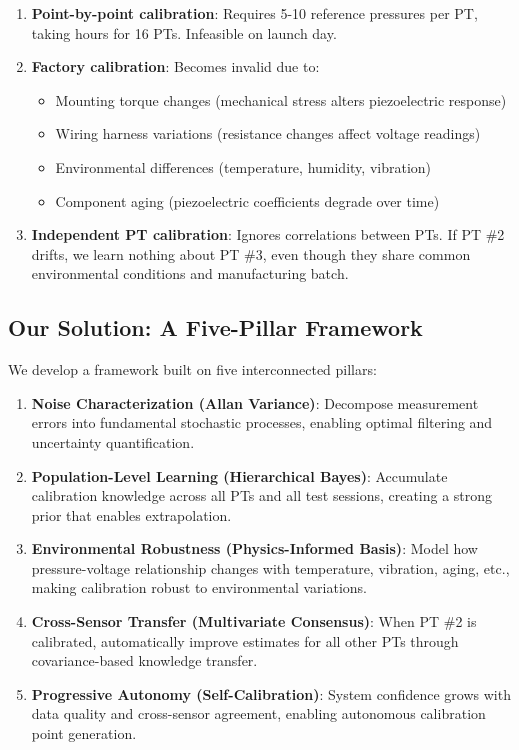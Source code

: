 \documentclass[11pt]{article}
\begin{document}
\begin{enumerate}
\item \textbf{Point-by-point calibration}: Requires 5-10 reference pressures per PT, taking hours for 16 PTs. Infeasible on launch day.

\item \textbf{Factory calibration}: Becomes invalid due to:
\begin{itemize}
\item Mounting torque changes (mechanical stress alters piezoelectric response)
\item Wiring harness variations (resistance changes affect voltage readings)
\item Environmental differences (temperature, humidity, vibration)
\item Component aging (piezoelectric coefficients degrade over time)
\end{itemize}

\item \textbf{Independent PT calibration}: Ignores correlations between PTs. If PT \#2 drifts, we learn nothing about PT \#3, even though they share common environmental conditions and manufacturing batch.
\end{enumerate}

\subsection{Our Solution: A Five-Pillar Framework}

We develop a framework built on five interconnected pillars:

\begin{enumerate}
\item \textbf{Noise Characterization (Allan Variance)}: Decompose measurement errors into fundamental stochastic processes, enabling optimal filtering and uncertainty quantification.

\item \textbf{Population-Level Learning (Hierarchical Bayes)}: Accumulate calibration knowledge across all PTs and all test sessions, creating a strong prior that enables extrapolation.

\item \textbf{Environmental Robustness (Physics-Informed Basis)}: Model how pressure-voltage relationship changes with temperature, vibration, aging, etc., making calibration robust to environmental variations.

\item \textbf{Cross-Sensor Transfer (Multivariate Consensus)}: When PT \#2 is calibrated, automatically improve estimates for all other PTs through covariance-based knowledge transfer.

\item \textbf{Progressive Autonomy (Self-Calibration)}: System confidence grows with data quality and cross-sensor agreement, enabling autonomous calibration point generation.
\end{enumerate}
\end{document}
